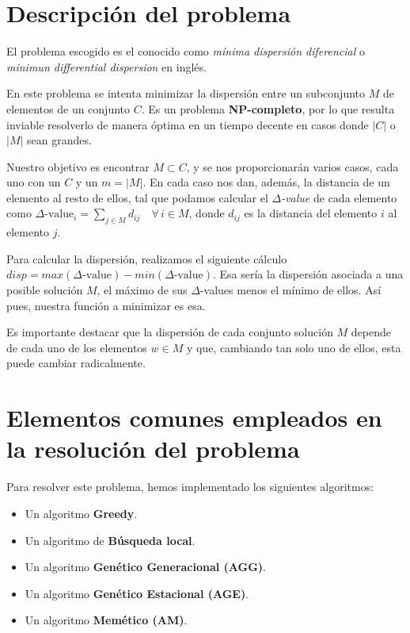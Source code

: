 \newpage %

\tableofcontents %

\newpage

\section{Descripción del problema}

El problema escogido es el conocido como \textit{mínima dispersión diferencial} o \textit{minimun differential dispersion} en inglés.

En este problema se intenta minimizar la dispersión entre un subconjunto $M$ de elementos de un conjunto $C$. Es un problema \textbf{NP-completo}, por lo que resulta inviable resolverlo de manera óptima en un tiempo decente en casos donde $|C|$ o $|M|$ sean grandes.

Nuestro objetivo es encontrar $M \subset C$, y se nos proporcionarán varios casos, cada uno con un $C$ y un $m =|M|$.
En cada caso nos dan, además, la distancia de un elemento al resto de ellos, tal que podamos calcular el \textit{$\Delta$-value} de cada elemento como $\displaystyle \Delta \text{-value}_i = \sum_{j \in M}d_{ij}\quad \forall \, i \in M$, donde $d_{ij}$ es la distancia del elemento $i$ al elemento $j$.

Para calcular la dispersión, realizamos el siguiente cálculo $disp = max(\Delta\text{-value})-min(\Delta\text{-value})$. Esa sería la dispersión asociada a una posible solución $M$, el máximo de sus $\Delta$-values menos el mínimo de ellos. Así pues, nuestra función a minimizar es esa.

Es importante destacar que la dispersión de cada conjunto solución $M$ depende de cada uno de los elementos $w \in M$ y que, cambiando tan solo uno de ellos, esta puede cambiar radicalmente.

\section{Elementos comunes empleados en la resolución del problema}
Para resolver este problema, hemos implementado los siguientes algoritmos:
\begin{itemize}
\item Un algoritmo \textbf{Greedy}.
\item Un algoritmo de \textbf{Búsqueda local}.
\item Un algoritmo \textbf{Genético Generacional (AGG)}.
\item Un algoritmo \textbf{Genético Estacional (AGE)}.
\item Un algoritmo \textbf{Memético (AM)}.
\end{itemize}

